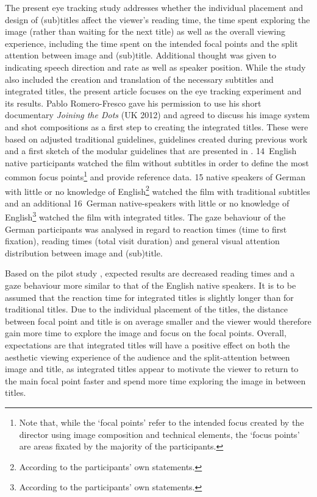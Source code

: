 \documentclass[output=paper]{langsci/langscibook}
\begin{document}
The present eye tracking study addresses whether the individual placement and design of (sub)titles affect the viewer’s reading time, the time spent exploring the image (rather than waiting for the next title) as well as the overall viewing experience, including the time spent on the intended focal points and the split attention between image and (sub)title. Additional thought was given to indicating speech direction and rate as well as speaker position. While the study also included the creation and translation of the necessary subtitles and integrated titles, the present article focuses on the eye tracking experiment and its results. Pablo Romero-Fresco gave his permission to use his short documentary \textit{Joining the Dots} (UK 2012) and agreed to discuss his image system and shot compositions as a first step to creating the integrated titles. These were based on adjusted traditional guidelines, guidelines created during previous work \citep{fox2012} and a first sketch of the modular guidelines that are presented in \citet{fox2015}. 14~English native participants watched the film without subtitles in order to define the most common focus points\footnote{Note that, while the ‘focal points’ refer to the intended focus created by the director using image composition and technical elements, the ‘focus points’ are areas fixated by the majority of the participants.} and provide reference data. 15 native speakers of German with little or no knowledge of English\footnote{According to the participants’ own statements.\par 
} watched the film with traditional subtitles and an additional 16~German native-speakers with little or no knowledge of English\footnote{  According to the participants’ own statements.\par 
} watched the film with integrated titles. The gaze behaviour of the German participants was analysed in regard to reaction times (time to first fixation), reading times (total visit duration) and general visual attention distribution between image and (sub)title.

Based on the pilot study \citep{fox2012}, expected results are decreased reading times and a gaze behaviour more similar to that of the English native speakers. It is to be assumed that the reaction time for integrated titles is slightly longer than for traditional titles. Due to the individual placement of the titles, the distance between focal point and title is on average smaller and the viewer would therefore gain more time to explore the image and focus on the focal points. Overall, expectations are that integrated titles will have a positive effect on both the aesthetic viewing experience of the audience and the split-attention between image and title, as integrated titles appear to motivate the viewer to return to the main focal point faster and spend more time exploring the image in between titles.
\end{document}
